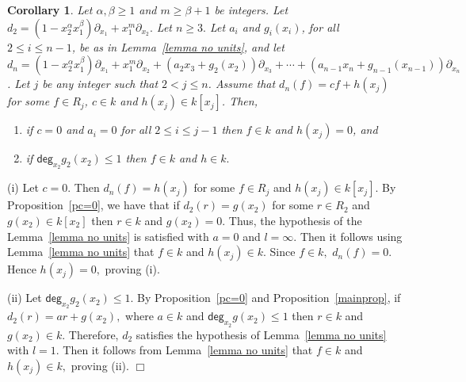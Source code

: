 \documentclass[12pt,reqno]{amsart}
\renewcommand{\deg}{\mathsf{deg}}
\renewcommand{\leq}{\leqslant}
\renewcommand{\geq}{\geqslant}
\numberwithin{thm}{section}
\newtheorem{cor}[thm]{Corollary}
\theoremstyle{definition}
\numberwithin{equation}{thm}
\renewenvironment{proof}{\par\noindent {\em Proof:}}{\hfill$\Box$\medskip}
\theoremstyle{plain}
\begin{document}
\begin{cor}
    Let $\alpha,\beta\geq 1$ and $m\geq \beta+1$ be integers. Let $d_2=(1-x_2^{\alpha} x_1^{\beta})\partial_{x_1} +x_1^m\partial_{x_2}.$ Let $n\geq 3.$ Let $a_i$ and $g_i(x_i)$, for all $2\leq i\leq n-1$, be as in Lemma~\ref{lemma no units}, and let $d_n=(1-x_2^{\alpha} x_1^{\beta})\partial_{x_1} +x_1^m\partial_{x_2}+(a_2 x_3 +g_2(x_2))\partial_{x_3}+\cdots+(a_{n-1}x_n + g_{n-1}(x_{n-1}))\partial_{x_n}$. Let $j$ be any integer such that $2 <j \leq n$. Assume that $d_n(f) = c f + h(x_j)$ for some $f\in R_j$, $c \in k$ and $h(x_j) \in k[x_j]$. Then, 
    \begin{enumerate}
        \item[(i)] if $c=0$ and $a_i=0$ for all $2\leq i\leq j-1$  then $f \in k$ and $h(x_j) =0$, and  
        \item[(ii)] if $\deg_{x_2}g_2(x_2)\leq 1$ then $f \in k$ and $h \in k.$
    \end{enumerate}
\end{cor}
\begin{proof}
  (i) Let $c=0.$ Then $d_n(f)= h(x_j)$ for some $f\in R_j$ and $h(x_j) \in k[x_j]$. By Proposition~\ref{pc=0}, we have that if $d_2(r)=g(x_2)$ for some $r\in R_2$ and $g(x_2)\in k[x_2]$ then $r\in k$ and  $g(x_2)=0$. Thus, the hypothesis of the Lemma~\ref{lemma no units} is satisfied with $a=0$ and $l=\infty.$ Then it follows using  Lemma~\ref{lemma no units} that $f\in k$ and $h(x_j)\in k.$ Since $f\in k,$ $d_n(f)=0.$ Hence $h(x_j)=0,$ proving (i).

  (ii) Let $\deg_{x_2}g_2(x_2)\leq 1$. By Proposition~\ref{pc=0} and Proposition~\ref{mainprop}, if $d_2(r)=ar+g(x_2),$ where $a\in k$ and $\deg_{x_2}g(x_2)\leq 1$ then $r\in k$ and $g(x_2)\in k.$ Therefore, $d_2$ satisfies the hypothesis of Lemma~\ref{lemma no units} with $l=1$. Then it follows from Lemma~\ref{lemma no units} that $f\in k$ and $h(x_j)\in k,$ proving (ii).
\end{proof}
\end{document}
